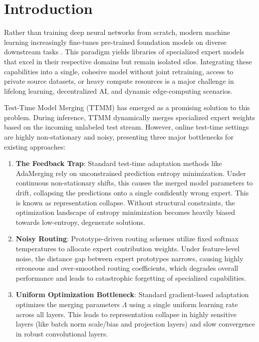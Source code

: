 \documentclass{article}
\theoremstyle{plain}
\theoremstyle{definition}
\theoremstyle{remark}
\begin{document}
\section{Introduction}
\label{submission-sec:intro}
Rather than training deep neural networks from scratch, modern machine learning increasingly fine-tunes pre-trained foundation models on diverse downstream tasks \cite{wortsman2022robust, radford2021learning}. This paradigm yields libraries of specialized expert models that excel in their respective domains but remain isolated silos. Integrating these capabilities into a single, cohesive model without joint retraining, access to private source datasets, or heavy compute resources is a major challenge in lifelong learning, decentralized AI, and dynamic edge-computing scenarios.

Test-Time Model Merging (TTMM) has emerged as a promising solution to this problem. During inference, TTMM dynamically merges specialized expert weights based on the incoming unlabeled test stream. However, online test-time settings are highly non-stationary and noisy, presenting three major bottlenecks for existing approaches:
\begin{enumerate}
    \item \textbf{The Feedback Trap}: Standard test-time adaptation methods like AdaMerging \cite{bayes2026} rely on unconstrained prediction entropy minimization. Under continuous non-stationary shifts, this causes the merged model parameters to drift, collapsing the predictions onto a single confidently wrong expert. This is known as representation collapse. Without structural constraints, the optimization landscape of entropy minimization becomes heavily biased towards low-entropy, degenerate solutions.
    \item \textbf{Noisy Routing}: Prototype-driven routing schemes utilize fixed softmax temperatures to allocate expert contribution weights. Under feature-level noise, the distance gap between expert prototypes narrows, causing highly erroneous and over-smoothed routing coefficients, which degrades overall performance and leads to catastrophic forgetting of specialized capabilities.
    \item \textbf{Uniform Optimization Bottleneck}: Standard gradient-based adaptation optimizes the merging parameters $\Lambda$ using a single uniform learning rate across all layers. This leads to representation collapse in highly sensitive layers (like batch norm scale/bias and projection layers) and slow convergence in robust convolutional layers.
\end{enumerate}
\end{document}
